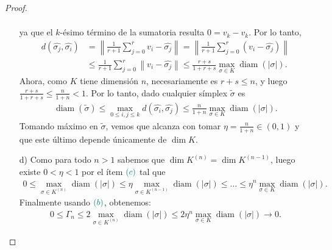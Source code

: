 \documentclass[11pt]{article}
\newcommand{\diam}[1]{\operatorname{diam}(#1)}
\newcommand{\paint}[2]{\color{#1}{#2}}
\begin{document}
\begin{proof}
\begin{itemize}
\begin{align*}
\end{align*}
ya que el $k$-\'esimo t\'ermino de la sumatoria resulta $0 = v_k-v_k$. Por lo tanto,
\begin{align*}
d(\widehat{\sigma_j},\widehat{\sigma_i}) & = \left\|\frac{1}{r+1}\sum_{j = 0}^rv_i - \widehat{\sigma_j}\right\| = \left\|\frac{1}{r+1}\sum_{j = 0}^r(v_i - \widehat{\sigma_j})\right\| \\
& \leq \frac{1}{r+1} \sum_{j = 0}^r \left\|v_i - \widehat{\sigma_j}\right\| \leq \frac{r+s}{1+r+s} \max_{\sigma \in K}\diam{|\sigma|}.
\end{align*}
Ahora, como $K$ tiene dimensi\'on $n$, necesariamente es $r+s \leq n$, y luego $\frac{r+s}{1+r+s} \leq \frac{n}{1+n} < 1$. Por lo tanto, dado cualquier s\'implex $\tilde{\sigma}$ es
\begin{align*}
\diam{\tilde{\sigma}} \leq \max_{0 \leq i,j \leq k}d(\widehat{\sigma_i},\widehat{\sigma_j}) \leq \frac{n}{1+n} \max_{\sigma \in K}\diam{|\sigma|}.
\end{align*}
Tomando m\'aximo en $\tilde{\sigma}$, vemos que alcanza con tomar $\eta = \frac{n}{1+n} \in (0,1)$ y que este \'ultimo depende \'unicamente de $\dim K$.
\item[d)] Como para todo $n > 1$ sabemos que $\dim K^{(n)} = \dim K^{(n-1)}$, luego existe $0 < \eta < 1$ por el \'item $\paint{grey-light-blue}{(c)}$ tal que
\begin{align*}
0 \leq \max_{\sigma \in K^{(n)}}\diam{|\sigma|} \leq \eta \max_{\sigma \in K^{(n-1)}}\diam{|\sigma|} \leq \dots \leq \eta^{n} \max_{\sigma \in K}\diam{|\sigma|}.
\end{align*}
Finalmente usando $\paint{grey-light-blue}{(b)}$, obtenemos: 
\begin{align*}
0 \leq \Gamma_n \leq 2 \max_{\sigma \in K^{(n)}}\diam{|\sigma|} \leq 2 \eta^{n} \max_{\sigma \in K}\diam{|\sigma|} \to 0.
\end{align*}
\end{itemize}
\end{proof}
\end{document}
